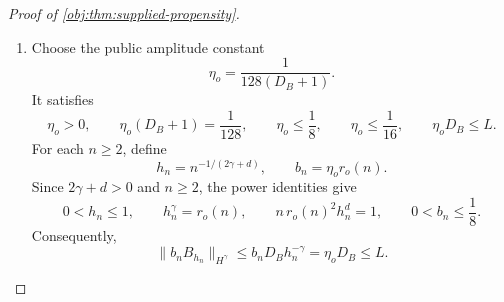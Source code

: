 \documentclass[11pt]{article}
\begin{document}
\begin{proof}[Proof of \cref{obj:thm:supplied-propensity}]
\begin{enumerate}
We need a uniform Hölder bound after scaling. Define
\[
p_*=\lceil\gamma\rceil-1,
\qquad
s_o=\gamma-p_*,
\qquad
0\le p_*\le2,\quad 0<s_o\le1.
\]
Write the iterated derivatives as
\[
D^0B=B,\qquad D^{\iota_{\mathrm{der}}+1}B=D(D^{\iota_{\mathrm{der}}}B),
\qquad \iota_{\mathrm{der}}\in\mathbb N,
\]
and define their finite operator-norm bounds by
\[
C_{B,\iota_{\mathrm{der}}}=\sup_{w\in\mathbb R^d}\|D^{\iota_{\mathrm{der}}}B(w)\|,
\qquad \iota_{\mathrm{der}}\in\mathbb N.
\]
Their finiteness follows from continuity and compact support. Set
\[
A_B=\max\{C_{B,p_*},C_{B,p_*+1}\},
\qquad
M_B=2A_B.
\]
The derivative bound and the mean-value inequality give, for every \(w,w'\in\mathbb R^d\),
\[
\|D^{p_*}B(w)-D^{p_*}B(w')\|
\le A_B\|w-w'\|_2,
\qquad
\|D^{p_*}B(w)-D^{p_*}B(w')\|\le2A_B.
\]
If \(\|w-w'\|_2\le1\), use
\(\|w-w'\|_2\le\|w-w'\|_2^{s_o}\); if
\(\|w-w'\|_2>1\), use \(1\le\|w-w'\|_2^{s_o}\).
Thus both cases yield
\[
\|D^{p_*}B(w)-D^{p_*}B(w')\|
\le M_B\|w-w'\|_2^{s_o}.
\]

Translation and dilation satisfy
\[
D^{\iota_{\mathrm{der}}}B_h(x)=h^{-\iota_{\mathrm{der}}}D^{\iota_{\mathrm{der}}}B\bigl((x-x_0)/h\bigr).
\]
Evaluating these multilinear maps in coordinate directions gives the bounds
\[
|\partial^\kappa B_h(x)|
\le d^{\iota_{\mathrm{der}}} C_{B,\iota_{\mathrm{der}}}h^{-\iota_{\mathrm{der}}}
\qquad(|\kappa|=\iota_{\mathrm{der}}\le p_*),
\]
and
\[
|\partial^\kappa B_h(x)-\partial^\kappa B_h(x')|
\le d^{p_*}M_Bh^{-\gamma}\|x-x'\|_2^{s_o}
\qquad(|\kappa|=p_*).
\]
Here the dimension factors are valid because every coordinate direction has norm at most \(d\). Define
\[
S_B=\sum_{\iota_{\mathrm{der}}=0}^{p_*}d^{\iota_{\mathrm{der}}}C_{B,\iota_{\mathrm{der}}},
\qquad
D_B=S_B+d^{p_*}M_B+1.
\]
For \(0<h\le1\) and \(\iota_{\mathrm{der}}\le p_*<\gamma\), one has
\(h^{-\iota_{\mathrm{der}}}\le h^{-\gamma}\). Applying the norm definition in
\cref{obj:def:holder-norm} to the preceding derivative and modulus bounds proves
\[
D_B>0,
\qquad
\|B_h\|_{H^\gamma}\le D_Bh^{-\gamma}
\qquad(0<h\le1).
\]
This also covers the integer smoothness endpoints, where \(s_o=1\).

\item Choose the public amplitude constant
\[
\eta_o=\frac{1}{128(D_B+1)}.
\]
It satisfies
\[
\eta_o>0,\qquad
\eta_o(D_B+1)=\frac1{128},\qquad
\eta_o\le\frac18,\qquad
\eta_o\le\frac1{16},\qquad
\eta_oD_B\le L.
\]
For each \(n\ge2\), define
\[
h_n=n^{-1/(2\gamma+d)},
\qquad
b_n=\eta_o r_o(n).
\]
Since \(2\gamma+d>0\) and \(n\ge2\), the power identities give
\[
0<h_n\le1,
\qquad
h_n^\gamma=r_o(n),
\qquad
n\,r_o(n)^2h_n^d=1,
\qquad
0<b_n\le\frac18.
\]
Consequently,
\[
\|b_nB_{h_n}\|_{H^\gamma}
\le b_nD_Bh_n^{-\gamma}
=\eta_oD_B
\le L.
\]


\end{enumerate}
\end{proof}
\end{document}
